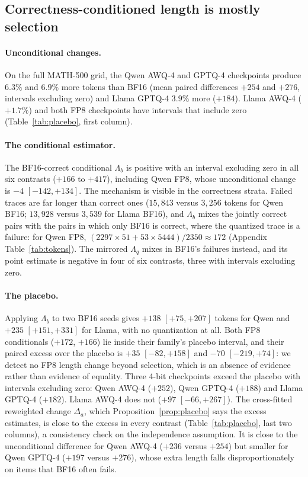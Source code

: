 \documentclass[11pt,a4paper]{article}
\begin{document}
\subsection{Correctness-conditioned length is mostly selection}
\label{sec:length}
\paragraph{Unconditional changes.} On the full MATH-500 grid, the Qwen AWQ-4 and GPTQ-4 checkpoints produce $6.3\%$ and $6.9\%$ more tokens than BF16 (mean paired differences $+254$ and $+276$, intervals excluding zero) and Llama GPTQ-4 $3.9\%$ more ($+184$). Llama AWQ-4 ($+1.7\%$) and both FP8 checkpoints have intervals that include zero (Table~\ref{tab:placebo}, first column).

\paragraph{The conditional estimator.} The BF16-correct conditional $\Lambda_b$ is positive with an interval excluding zero in all six contrasts ($+166$ to $+417$), including Qwen FP8, whose unconditional change is $-4$ $[-142,+134]$. The mechanism is visible in the correctness strata. Failed traces are far longer than correct ones ($15{,}843$ versus $3{,}256$ tokens for Qwen BF16; $13{,}928$ versus $3{,}539$ for Llama BF16), and $\Lambda_b$ mixes the jointly correct pairs with the pairs in which only BF16 is correct, where the quantized trace is a failure: for Qwen FP8, $(2297\times 51+53\times 5444)/2350\approx 172$ (Appendix Table~\ref{tab:tokens}). The mirrored $\Lambda_q$ mixes in BF16's failures instead, and its point estimate is negative in four of six contrasts, three with intervals excluding zero.

\paragraph{The placebo.} Applying $\Lambda_b$ to two BF16 seeds gives $+138$ $[+75,+207]$ tokens for Qwen and $+235$ $[+151,+331]$ for Llama, with no quantization at all. Both FP8 conditionals ($+172$, $+166$) lie inside their family's placebo interval, and their paired excess over the placebo is $+35$ $[-82,+158]$ and $-70$ $[-219,+74]$: we detect no FP8 length change beyond selection, which is an absence of evidence rather than evidence of equality. Three 4-bit checkpoints exceed the placebo with intervals excluding zero: Qwen AWQ-4 ($+252$), Qwen GPTQ-4 ($+188$) and Llama GPTQ-4 ($+182$). Llama AWQ-4 does not ($+97$ $[-66,+267]$). The cross-fitted reweighted change $\Delta_a$, which Proposition~\ref{prop:placebo} says the excess estimates, is close to the excess in every contrast (Table~\ref{tab:placebo}, last two columns), a consistency check on the independence assumption. It is close to the unconditional difference for Qwen AWQ-4 ($+236$ versus $+254$) but smaller for Qwen GPTQ-4 ($+197$ versus $+276$), whose extra length falls disproportionately on items that BF16 often fails.
\end{document}
